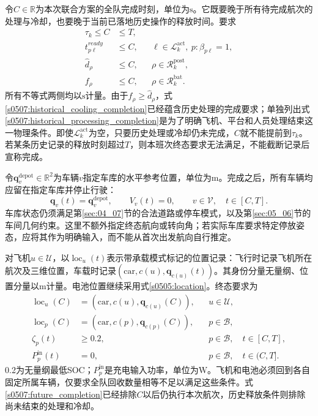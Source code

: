 令$C\in\mathbb R$为本次联合方案的全队完成时刻，单位为$\mathrm s$。它既要晚于所有待完成航次的处理与冷却，也要晚于当前已落地历史操作的释放时间。要求
\begin{align}
 \tau_k\le C&\le T,
 \label{s0507:completion_domain}\\
 t_{p\ell}^{ready}
 &\le C,
 &&\ell\in\mathcal L_k^{\mathrm{act}},\ p:\beta_{p\ell}=1,
 \label{s0507:future_completion}\\
 \widehat d_\rho&\le C,
 &&\rho\in\mathcal R_k^{\mathrm{post}},
 \label{s0507:historical_processing_completion}\\
 f_\rho&\le C,
 &&\rho\in\mathcal R_k^{\mathrm{bat}}.
 \label{s0507:historical_cooling_completion}
\end{align}
所有不等式两侧均以$\mathrm s$计量。由于$f_\rho\ge\widehat d_\rho$，式\eqref{s0507:historical_cooling_completion}已经蕴含历史处理的完成要求；单独列出式\eqref{s0507:historical_processing_completion}是为了明确飞机、平台和人员处理结束这一物理条件。即使$\mathcal L_k^{\mathrm{act}}$为空，只要历史处理或冷却仍未完成，$C$就不能提前到$\tau_k$。若某条历史记录的释放时刻超过$T$，则本班次终态要求无法满足，不能截断记录后宣称完成。

令$\mathbf q_v^{\mathrm{depot}}\in\mathbb R^2$为车辆$v$指定车库的水平参考位置，单位为$\mathrm m$。完成之后，所有车辆均应留在指定车库并停止行驶：
\begin{equation}
 \mathbf q_v(t)=\mathbf q_v^{\mathrm{depot}},\qquad
 V_v(t)=0,
 \qquad v\in\mathcal V,\quad t\in[C,T].
 \label{s0507:terminal_vehicles}
\end{equation}
车库状态仍须满足第\ref{sec:04_07}节的合法道路或停车模式，以及第\ref{sec:05_06}节的车间几何约束。这里不额外指定终态航向或转向角；若实际车库要求特定停放姿态，应将其作为明确输入，而不能从首次出发航向自行推定。

对飞机$u\in\mathcal U$，以$\operatorname{loc}_u(t)$表示带承载模式标记的位置记录：飞行时记录飞机所在航次及三维位置，车载时记录$(\mathrm{car},c(u),\mathbf q_{c(u)}(t))$。其身份分量无量纲、位置分量以$\mathrm m$计量。电池位置继续采用式\eqref{s0505:location}。终态要求为
\begin{align}
 \operatorname{loc}_u(C)
 &=(\mathrm{car},c(u),\mathbf q_{c(u)}(C)),
 &&u\in\mathcal U,
 \label{s0507:terminal_aircraft}\\
 \operatorname{loc}_p(C)
 &=(\mathrm{car},c(p),\mathbf q_{c(p)}(C)),
 &&p\in\mathcal B,
 \label{s0507:terminal_batteries}\\
 \zeta_p(t)&\ge0.2,
 &&p\in\mathcal B,\quad t\in[C,T],
 \label{s0507:terminal_energy}\\
 P_p^{\mathrm{in}}(t)&=0,
 &&p\in\mathcal B,\quad t\in(C,T].
 \label{s0507:no_after_completion_charge}
\end{align}
0.2为无量纲最低SOC；$P_p^{\mathrm{in}}$是充电输入功率，单位为$\mathrm W$。飞机和电池必须回到各自固定所属车辆，仅要求全队回收数量相等不足以满足这些条件。式\eqref{s0507:future_completion}已经排除$C$以后仍执行本次航次，历史释放条件则排除尚未结束的处理和冷却。

